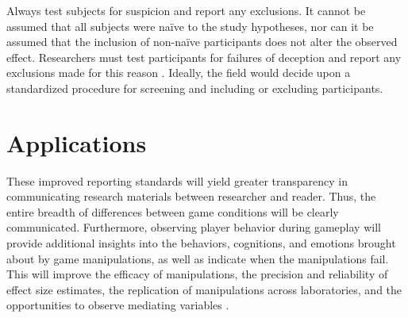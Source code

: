 Always test subjects for suspicion and report any exclusions. It cannot be assumed that all subjects were naïve to the study hypotheses, nor can it be assumed that the inclusion of non-naïve participants does not alter the observed effect. Researchers must test participants for failures of deception and report any exclusions made for this reason . Ideally, the field would decide upon a standardized procedure for screening and including or excluding participants.

\section{Applications}
These improved reporting standards will yield greater transparency in communicating research materials between researcher and reader. Thus, the entire breadth of differences between game conditions will be clearly communicated. Furthermore, observing player behavior during gameplay will provide additional insights into the behaviors, cognitions, and emotions brought about by game manipulations, as well as indicate when the manipulations fail. This will improve the efficacy of manipulations, the precision and reliability of effect size estimates, the replication of manipulations across laboratories, and the opportunities to observe mediating variables .

